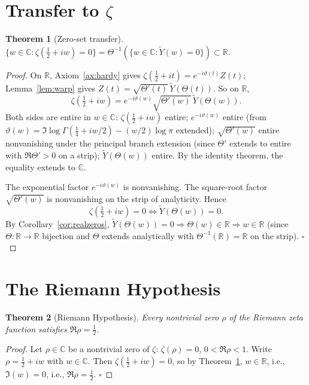\documentclass[11pt]{article}
\newtheorem{theorem}{Theorem}
\theoremstyle{definition}
\newcommand{\R}{\mathbb{R}}
\newcommand{\C}{\mathbb{C}}
\begin{document}
\section{Transfer to \(\zeta\)}

\begin{theorem}[Zero-set transfer]\label{thm:transfer}
\(\{w\in\C:\zeta(\tfrac12+iw)=0\}=\Theta^{-1}(\{w\in\C:\tilde Y(w)=0\})\subset\R\).
\end{theorem}

\begin{proof}
On \(\R\), Axiom~\ref{ax:hardy} gives \(\zeta(\tfrac12+it)=e^{-i\vartheta(t)}Z(t)\); Lemma~\ref{lem:warp} gives \(Z(t)=\sqrt{\Theta'(t)}\,\tilde Y(\Theta(t))\). So on \(\R\),
\[
\zeta(\tfrac12+iw)=e^{-i\vartheta(w)}\sqrt{\Theta'(w)}\,\tilde Y(\Theta(w)).
\]
Both sides are entire in \(w\in\C\): \(\zeta(\tfrac12+iw)\) entire; \(e^{-i\vartheta(w)}\) entire (from \(\vartheta(w)=\Im\log\Gamma(\tfrac14+iw/2)-(w/2)\log\pi\) extended); \(\sqrt{\Theta'(w)}\) entire nonvanishing under the principal branch extension (since \(\Theta'\) extends to entire with \(\Re\Theta'>0\) on a strip); \(\tilde Y(\Theta(w))\) entire. By the identity theorem, the equality extends to \(\C\).

The exponential factor \(e^{-i\vartheta(w)}\) is nonvanishing. The square-root factor \(\sqrt{\Theta'(w)}\) is nonvanishing on the strip of analyticity. Hence
\[
\zeta(\tfrac12+iw)=0\iff\tilde Y(\Theta(w))=0.
\]
By Corollary~\ref{cor:realzeros}, \(\tilde Y(\Theta(w))=0\Rightarrow\Theta(w)\in\R\Rightarrow w\in\R\) (since \(\Theta:\R\to\R\) bijection and \(\Theta\) extends analytically with \(\Theta^{-1}(\R)=\R\) on the strip). \(\square\)
\end{proof}

\section{The Riemann Hypothesis}

\begin{theorem}[Riemann Hypothesis]\label{thm:RH}
Every nontrivial zero \(\rho\) of the Riemann zeta function satisfies \(\Re\rho=\tfrac12\).
\end{theorem}

\begin{proof}
Let \(\rho\in\C\) be a nontrivial zero of \(\zeta\): \(\zeta(\rho)=0\), \(0<\Re\rho<1\). Write \(\rho=\tfrac12+iw\) with \(w\in\C\). Then \(\zeta(\tfrac12+iw)=0\), so by Theorem~\ref{thm:transfer}, \(w\in\R\), i.e., \(\Im(w)=0\), i.e., \(\Re\rho=\tfrac12\). \(\square\)
\end{proof}
\end{document}
